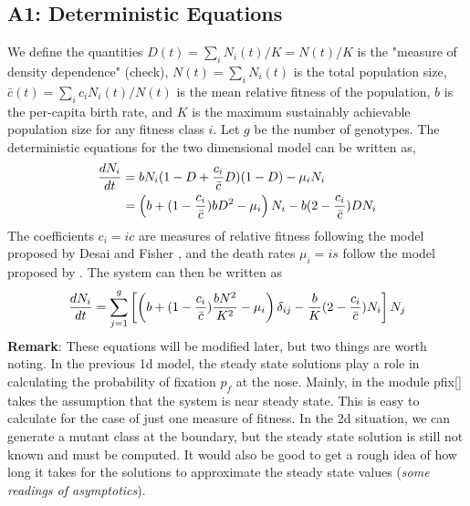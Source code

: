 \documentclass{article}
\begin{document}
\subsection*{A1: Deterministic Equations}
We define the quantities $D(t) = \sum_{i} N_i(t)/K=N(t)/K$ is the "measure of density dependence" (check), $N(t) = \sum_i N_i(t)$ is the total population size, $\bar{c}(t)=\sum_i c_i N_i(t)/N(t)$ is the mean relative fitness of the population, $b$ is the per-capita birth rate, and $K$ is the maximum sustainably achievable population size for any fitness class $i$.  Let $g$ be the number of genotypes.  The deterministic equations for the two dimensional model can be written as,
\begin{equation}
\begin{aligned}
\frac{dN_i}{dt}&=b N_i (1-D+{c_i \over \bar{c}}D)(1-D)-\mu_i N_i\\
&=\left(b+(1-{c_i \over \bar{c}})bD^2- \mu_i\right)N_i -b(2-{c_i \over \bar{c}})DN_i\\
\end{aligned}
\end{equation}
The coefficients $c_i = i c$ are measures of relative fitness following the model proposed by Desai and Fisher \citep{DesFish07}, and the death rates $\mu_i = i s$ follow the model proposed by \citep{BertMas15}.  The system can then be written as
\begin{equation}
\begin{aligned}
\frac{dN_i}{dt}&=\sum_{j=1}^g\left[\left(b+(1-{c_i \over \bar{c}}){bN^2\over K^2}- \mu_i\right)\delta_{ij} - {b \over K}(2-{c_i \over \bar{c}})N_i \right]N_j\\
\end{aligned}
\end{equation}
\textbf{Remark}: These equations will be modified later, but two things are worth noting.  In the previous 1d model, the steady state solutions play a role in calculating the probability of fixation $p_f$ at the nose.  Mainly, in the module pfix[] takes the assumption that the system is near steady state.  This is easy to calculate for the case of just one measure of fitness.  In the 2d situation, we can generate a mutant class at the boundary, but the steady state solution is still not known and must be computed.  It would also be good to get a rough idea of how long it takes for the solutions to approximate the steady state values (\textit{some readings of asymptotics}).
\end{document}
